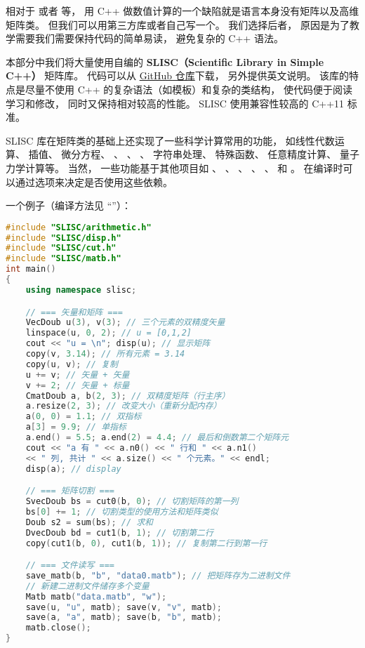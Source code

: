 

相对于  或者  等， 用 C++ 做数值计算的一个缺陷就是语言本身没有矩阵以及高维矩阵类。 但我们可以用第三方库或者自己写一个。 我们选择后者， 原因是为了教学需要我们需要保持代码的简单易读， 避免复杂的 C++ 语法。

本部分中我们将大量使用自编的 \textbf{SLISC（Scientific Library in Simple C++）} 矩阵库。 代码可以从 \href{https://github.com/MacroUniverse/SLISC}{GitHub 仓库}下载， 另外提供英文说明。 该库的特点是尽量不使用 C++ 的复杂语法（如模板）和复杂的类结构， 使代码便于阅读学习和修改， 同时又保持相对较高的性能。 SLISC 使用兼容性较高的 C++11 标准。

SLISC 库在矩阵类的基础上还实现了一些科学计算常用的功能， 如线性代数运算、 插值、 微分方程、 、 、 、 字符串处理、 特殊函数、 任意精度计算、 量子力学计算等。 当然， 一些功能基于其他项目如 、 、 、 、 、  和 。 在编译时可以通过选项来决定是否使用这些依赖。

一个例子（编译方法见 “”）：
\begin{lstlisting}[language=cpp, caption=intro.cpp]
#include "SLISC/arithmetic.h"
#include "SLISC/disp.h"
#include "SLISC/cut.h"
#include "SLISC/matb.h"
int main()
{
	using namespace slisc;

	// === 矢量和矩阵 ===
	VecDoub u(3), v(3); // 三个元素的双精度矢量
	linspace(u, 0, 2); // u = [0,1,2]
	cout << "u = \n"; disp(u); // 显示矩阵
	copy(v, 3.14); // 所有元素 = 3.14
	copy(u, v); // 复制
	u += v; // 矢量 + 矢量
	v += 2; // 矢量 + 标量
	CmatDoub a, b(2, 3); // 双精度矩阵（行主序）
	a.resize(2, 3); // 改变大小（重新分配内存）
	a(0, 0) = 1.1; // 双指标
	a[3] = 9.9; // 单指标
	a.end() = 5.5; a.end(2) = 4.4; // 最后和倒数第二个矩阵元
	cout << "a 有 " << a.n0() << " 行和 " << a.n1()
	<< " 列, 共计 " << a.size() << " 个元素。" << endl;
	disp(a); // display

	// === 矩阵切割 ===
	SvecDoub bs = cut0(b, 0); // 切割矩阵的第一列
	bs[0] += 1; // 切割类型的使用方法和矩阵类似
	Doub s2 = sum(bs); // 求和
	DvecDoub bd = cut1(b, 1); // 切割第二行
	copy(cut1(b, 0), cut1(b, 1)); // 复制第二行到第一行

	// === 文件读写 ===
	save_matb(b, "b", "data0.matb"); // 把矩阵存为二进制文件
	// 新建二进制文件储存多个变量
	Matb matb("data.matb", "w");
	save(u, "u", matb); save(v, "v", matb);
	save(a, "a", matb); save(b, "b", matb);
	matb.close();
}
\end{lstlisting}

